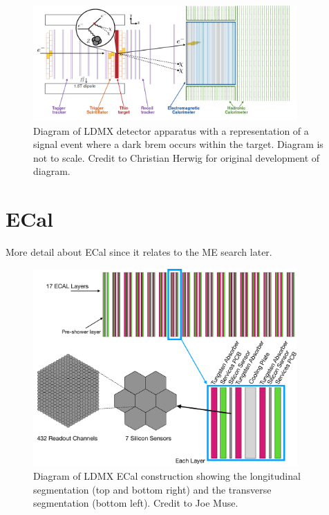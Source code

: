 \begin{figure}
    \centering
    \includegraphics[width=0.9\textwidth]{figures/ldmx/experiment/detector.png}
    \caption{
        Diagram of LDMX detector apparatus with a representation of a signal event where
        a dark brem occurs within the target. Diagram is not to scale. Credit to Christian Herwig
        for original development of diagram.
    }
    \label{fig:ldmx-det}
\end{figure}

\section{ECal}
More detail about ECal since it relates to the ME search later.

\begin{figure}
    \centering
    \includegraphics[width=0.9\textwidth]{figures/ldmx/experiment/ecal.pdf}
    \caption{
        Diagram of LDMX ECal construction showing the longitudinal segmentation
        (top and bottom right) and the transverse segmentation (bottom left).
        Credit to Joe Muse.
    }
    \label{fig:ldmx-ecal}
\end{figure}
